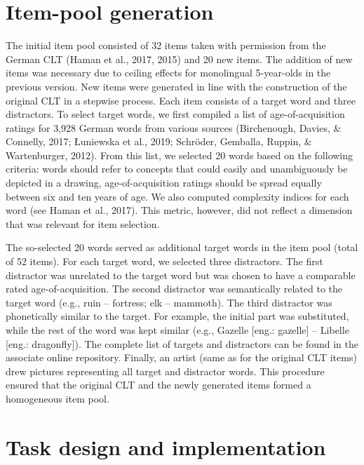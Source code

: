 \documentclass[
  man,floatsintext]{apa6}
\begin{document}
\hypertarget{item-pool-generation}{%
\section{Item-pool generation}\label{item-pool-generation}}

The initial item pool consisted of 32 items taken with permission from the German CLT (Haman et al., 2017, 2015) and 20 new items. The addition of new items was necessary due to ceiling effects for monolingual 5-year-olds in the previous version. New items were generated in line with the construction of the original CLT in a stepwise process. Each item consists of a target word and three distractors. To select target words, we first compiled a list of age-of-acquisition ratings for 3,928 German words from various sources (Birchenough, Davies, \& Connelly, 2017; Łuniewska et al., 2019; Schröder, Gemballa, Ruppin, \& Wartenburger, 2012). From this list, we selected 20 words based on the following criteria: words should refer to concepts that could easily and unambiguously be depicted in a drawing, age-of-acquisition ratings should be spread equally between six and ten years of age. We also computed complexity indices for each word (see Haman et al., 2017). This metric, however, did not reflect a dimension that was relevant for item selection.

The so-selected 20 words served as additional target words in the item pool (total of 52 items). For each target word, we selected three distractors. The first distractor was unrelated to the target word but was chosen to have a comparable rated age-of-acquisition. The second distractor was semantically related to the target word (e.g., ruin -- fortress; elk -- mammoth). The third distractor was phonetically similar to the target. For example, the initial part was substituted, while the rest of the word was kept similar (e.g., Gazelle {[}eng.: gazelle{]} -- Libelle {[}eng.: dragonfly{]}). The complete list of targets and distractors can be found in the associate online repository. Finally, an artist (same as for the original CLT items) drew pictures representing all target and distractor words. This procedure ensured that the original CLT and the newly generated items formed a homogeneous item pool.

\hypertarget{task-design-and-implementation}{%
\section{Task design and implementation}\label{task-design-and-implementation}}
\end{document}
